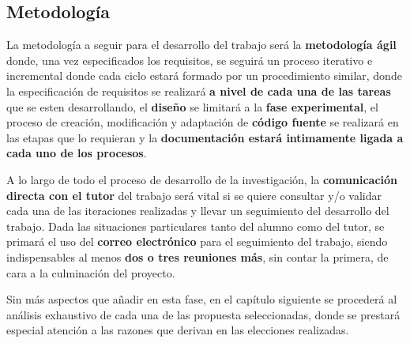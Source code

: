 \subsection{Metodología}

La metodología a seguir para el desarrollo del trabajo será la \textbf{metodología ágil} donde, una vez especificados los requisitos, se seguirá un proceso iterativo e incremental donde cada ciclo estará formado por un procedimiento similar, donde la especificación de requisitos se realizará \textbf{a nivel de cada una de las tareas} que se esten desarrollando, el \textbf{diseño} se limitará a la \textbf{fase experimental}, el proceso de creación, modificación y adaptación de \textbf{código fuente} se realizará en las etapas que lo requieran y la \textbf{documentación estará intimamente ligada a cada uno de los procesos}.

A lo largo de todo el proceso de desarrollo de la investigación, la \textbf{comunicación directa con el tutor} del trabajo será vital si se quiere consultar y/o validar cada una de las iteraciones realizadas y llevar un seguimiento del desarrollo del trabajo. Dada las situaciones particulares tanto del alumno como del tutor, se primará el uso del \textbf{correo electrónico} para el seguimiento del trabajo, siendo indispensables al menos \textbf{dos o tres reuniones más}, sin contar la primera, de cara a la culminación del proyecto.

Sin más aspectos que añadir en esta fase, en el capítulo siguiente se procederá al análisis exhaustivo de cada una de las propuesta seleccionadas, donde se prestará especial atención a las razones que derivan en las elecciones realizadas.





